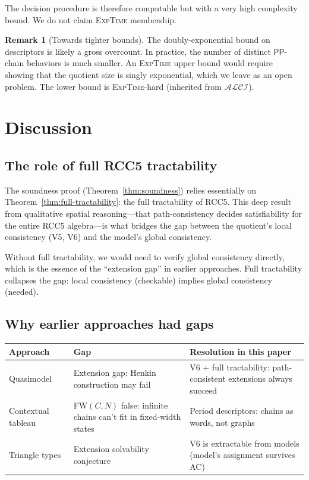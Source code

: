 \documentclass[a4paper,11pt]{article}
\theoremstyle{definition}
\newtheorem{remark}[theorem]{Remark}
\newcommand{\ALCI}{\ensuremath{\mathcal{ALCI}}}
\newcommand{\PP}{\ensuremath{\mathsf{PP}}}
\newcommand{\EXPTIME}{\textsc{ExpTime}}
\begin{document}
The decision procedure is therefore computable but with a very high
complexity bound.  We do not claim \EXPTIME{} membership.

\begin{remark}[Towards tighter bounds]
The doubly-exponential bound on descriptors is likely a gross
overcount.  In practice, the number of distinct $\PP$-chain behaviors
is much smaller.  An \EXPTIME{} upper bound would require showing
that the quotient size is singly exponential, which we leave as an
open problem.  The lower bound is \EXPTIME-hard (inherited from
$\ALCI$).
\end{remark}


\section{Discussion}\label{sec:discussion}

\subsection{The role of full RCC5 tractability}

The soundness proof (Theorem~\ref{thm:soundness}) relies essentially
on Theorem~\ref{thm:full-tractability}: the full tractability of RCC5.
This deep result from qualitative spatial reasoning---that
path-consistency decides satisfiability for the entire RCC5
algebra---is what bridges the gap between the quotient's local
consistency (V5, V6) and the model's global consistency.

Without full tractability, we would need to verify global consistency
directly, which is the essence of the ``extension gap'' in earlier
approaches.  Full tractability collapses the gap: local consistency
(checkable) implies global consistency (needed).

\subsection{Why earlier approaches had gaps}

\begin{center}
\renewcommand{\arraystretch}{1.2}
\begin{tabular}{p{3cm}p{3.5cm}p{5.5cm}}
\toprule
\textbf{Approach} & \textbf{Gap} & \textbf{Resolution in this paper} \\
\midrule
Quasimodel~\cite{Claude2026}
  & Extension gap: Henkin construction may fail
  & V6 + full tractability: path-consistent extensions always succeed \\
Contextual tableau~\cite{GPT2026}
  & FW$(C,N)$ false: infinite chains can't fit in fixed-width states
  & Period descriptors: chains as words, not graphs \\
Triangle types~\cite{ClaudeTriangle2026}
  & Extension solvability conjecture
  & V6 is extractable from models (model's assignment survives AC) \\
\bottomrule
\end{tabular}
\end{center}
\end{document}
